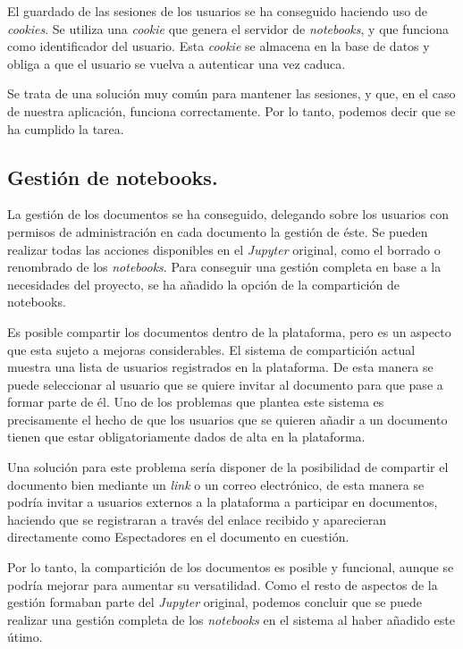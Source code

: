 \documentclass[11pt,spanish,listoffigures]{tfgetsinf}
\begin{document}
El guardado de las sesiones de los usuarios se ha conseguido haciendo uso de \textit{cookies}. Se utiliza una \textit{cookie} que genera el servidor de \textit{notebooks}, y que funciona como identificador del usuario. Esta \textit{cookie} se almacena en la base de datos y obliga a que el usuario se vuelva a autenticar una vez caduca.

Se trata de una solución muy común para mantener las sesiones, y que, en el caso de nuestra aplicación, funciona correctamente. Por lo tanto, podemos decir que se ha cumplido la tarea.


\subsection{Gestión de notebooks.}
\label{subsec:objetivos-conc-compartir}

La gestión de los documentos se ha conseguido, delegando sobre los usuarios con permisos de administración en cada documento la gestión de éste. Se pueden realizar todas las acciones disponibles en el \textit{Jupyter} original, como el borrado o renombrado de los \textit{notebooks}. Para conseguir una gestión completa en base a la necesidades del proyecto, se ha añadido la opción de la compartición de notebooks. 

Es posible compartir los documentos dentro de la plataforma, pero es un aspecto que esta sujeto a mejoras considerables. El sistema de compartición actual muestra una lista de usuarios registrados en la plataforma. De esta manera se puede seleccionar al usuario que se quiere invitar al documento para que pase a formar parte de él. Uno de los problemas que plantea este sistema es precisamente el hecho de que los usuarios que se quieren añadir a un documento tienen que estar obligatoriamente dados de alta en la plataforma.

Una solución para este problema sería disponer de la posibilidad de compartir el documento bien mediante un \textit{\gls{link}} o un correo electrónico, de esta manera se podría invitar a usuarios externos a la plataforma a participar en documentos, haciendo que se registraran a través del enlace recibido y aparecieran directamente como Espectadores en el documento en cuestión.

Por lo tanto, la compartición de los documentos es posible y funcional, aunque se podría mejorar para aumentar su versatilidad. Como el resto de aspectos de la gestión formaban parte del \textit{Jupyter} original, podemos concluir que se puede realizar una gestión completa de los \textit{notebooks} en el sistema al haber añadido este útimo.
\end{document}

